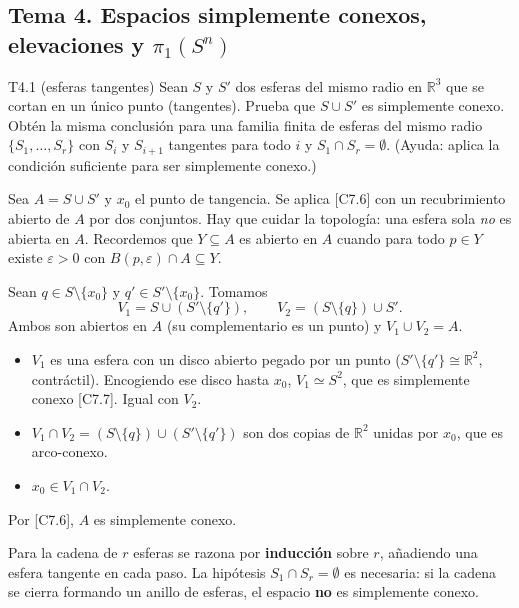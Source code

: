 \subsection{Tema 4. Espacios simplemente conexos, elevaciones y $\pi_1(S^n)$}

\begin{ejercicio}{T4.1 (esferas tangentes)}
Sean $S$ y $S'$ dos esferas del mismo radio en $\mathbb{R}^3$ que se cortan en un único punto (tangentes). Prueba que $S \cup S'$ es simplemente conexo. Obtén la misma conclusión para una familia finita de esferas del mismo radio $\{S_1,\dots,S_r\}$ con $S_i$ y $S_{i+1}$ tangentes para todo $i$ y $S_1 \cap S_r = \emptyset$. (Ayuda: aplica la condición suficiente para ser simplemente conexo.)

\sol {}

Sea $A = S \cup S'$ y $x_0$ el punto de tangencia. Se aplica [C7.6] con un recubrimiento abierto de $A$ por dos conjuntos. Hay que cuidar la topología: una esfera sola \emph{no} es abierta en $A$. Recordemos que $Y \subseteq A$ es abierto en $A$ cuando para todo $p \in Y$ existe $\varepsilon > 0$ con $B(p,\varepsilon) \cap A \subseteq Y$.

Sean $q \in S \setminus \{x_0\}$ y $q' \in S' \setminus \{x_0\}$. Tomamos
\[ V_1 = S \cup (S' \setminus \{q'\}), \qquad V_2 = (S \setminus \{q\}) \cup S'. \]
Ambos son abiertos en $A$ (su complementario es un punto) y $V_1 \cup V_2 = A$.
\begin{itemize}
    \item $V_1$ es una esfera con un disco abierto pegado por un punto ($S' \setminus \{q'\} \cong \mathbb{R}^2$, contráctil). Encogiendo ese disco hasta $x_0$, $V_1 \simeq S^2$, que es simplemente conexo [C7.7]. Igual con $V_2$.
    \item $V_1 \cap V_2 = (S \setminus \{q\}) \cup (S' \setminus \{q'\})$ son dos copias de $\mathbb{R}^2$ unidas por $x_0$, que es arco-conexo.
    \item $x_0 \in V_1 \cap V_2$.
\end{itemize}
Por [C7.6], $A$ es simplemente conexo.

Para la cadena de $r$ esferas se razona por \textbf{inducción} sobre $r$, añadiendo una esfera tangente en cada paso. La hipótesis $S_1 \cap S_r = \emptyset$ es necesaria: si la cadena se cierra formando un anillo de esferas, el espacio \textbf{no} es simplemente conexo.
\end{ejercicio}

